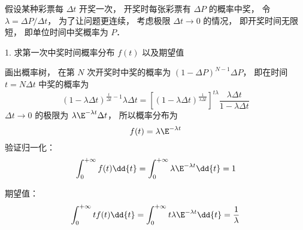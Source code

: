 
假设某种彩票每 $\Delta t$ 开奖一次， 开奖时每张彩票有 $\Delta P$ 的概率中奖，  令 $\lambda = {\Delta P}/{\Delta t}$， 为了让问题更连续， 考虑极限 $\Delta t\to 0$ 的情况， 即开奖时间无限短， 即单位时间中奖概率为 $P$．


1. 求第一次中奖时间概率分布 $f(t)$ 以及期望值

画出概率树， 在第 $N$ 次开奖时中奖的概率为 $(1-\Delta P)^{N-1} \Delta P$， 即在时间 $t = N\Delta t$ 中奖的概率为
\begin{equation}
(1-\lambda\Delta t)^{\frac{t}{\Delta t}-1} \lambda\Delta t
= [(1-\lambda\Delta t)^{\frac{1}{\lambda\Delta t}}]^{t\lambda} \frac{\lambda\Delta t}{1-\lambda\Delta t}
\end{equation}
$\Delta t\to 0$ 的极限为 $\lambda\E^{-\lambda t}\Delta t$， 所以概率分布为
\begin{equation}
f(t) = \lambda\E^{-\lambda t}
\end{equation}
验证归一化：
\begin{equation}
\int_0^{+\infty} f(t) \dd{t} = \int_0^{+\infty} \lambda\E^{-\lambda t} \dd{t} = 1
\end{equation}

期望值：
\begin{equation}
\int_0^{+\infty} t f(t) \dd{t} = \int_0^{+\infty}t \lambda\E^{-\lambda t} \dd{t} = \frac{1}{\lambda}
\end{equation}
